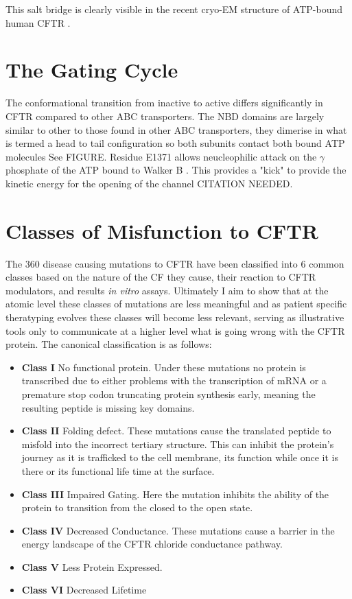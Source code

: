 This salt bridge is clearly visible in the recent cryo-EM structure of ATP-bound human CFTR \cite{zhang2018}.

\section{The Gating Cycle}
The conformational transition from inactive to active differs significantly in CFTR compared to other ABC transporters. The NBD domains are largely similar to other to those found in other ABC transporters, they dimerise in what is termed a head to tail configuration so both subunits contact both bound ATP molecules \cite{} See FIGURE. Residue E1371 allows neucleophilic attack on the $\gamma$ phosphate of the ATP bound to Walker B \cite{Stratford2007}. This provides a "kick" to provide the kinetic energy for the opening of the channel CITATION NEEDED. 

\section{Classes of Misfunction to CFTR}
The 360 disease causing mutations to CFTR have been classified into 6 common classes based on the nature of the CF they cause, their reaction to CFTR modulators, and results \textit{in vitro} assays. Ultimately I aim to show that at the atomic level these classes of mutations are less meaningful and as patient specific theratyping evolves these classes will become less relevant, serving as illustrative tools only to communicate at a higher level what is going wrong with the CFTR protein. The canonical classification is as follows:
\begin{itemize}
	\item \textbf{Class I} No functional protein. Under these mutations no protein is transcribed due to either problems with the transcription of mRNA or a premature stop codon truncating protein synthesis early, meaning the resulting peptide is missing key domains. 
	\item \textbf{Class II} Folding defect. These mutations cause the translated peptide to misfold into the incorrect tertiary structure. This can inhibit the protein's journey as it is trafficked to the cell membrane, its function while once it is there or its functional life time at the surface. 
	\item \textbf{Class III} Impaired Gating. Here the mutation inhibits the ability of the protein to transition from the closed to the open state. 
	\item \textbf{Class IV} Decreased Conductance. These mutations cause a barrier in the energy landscape of the CFTR chloride conductance pathway.
	\item \textbf{Class V} Less Protein Expressed.  
	\item \textbf{Class VI} Decreased Lifetime

\end{itemize}

